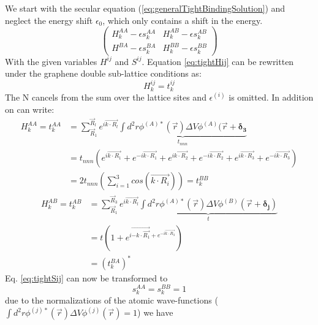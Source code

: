 		We start with the secular equation (\ref{eq:generalTightBindingSolution}) and neglect the energy shift $\epsilon_0$, which only contains a shift in the energy.
		\begin{equation}
			\begin{pmatrix}
				H_k^{AA} - \epsilon s_k^{AA} & 	H_k^{AB} - \epsilon s_k^{AB} \\
				H^{BA} - \epsilon s_k^{BA} & 	H_k^{BB} - \epsilon s_k^{BB}
			\end{pmatrix}
		\end{equation}
		With the given variables $H^{ij}$ and $S^{ij}$. Equation \ref{eq:tightHij} can be rewritten under the graphene double sub-lattice conditions as:
		\begin{equation}
			H_k^{ij} = t_k^{ij}
		\end{equation}
		The N cancels from the sum over the lattice sites and $\epsilon^{(i)}$ is omitted. In addition on can write: 
		\begin{equation}
			\begin{split}
				H_k^{AA} = t_k^{AA} &= \sum_{\vec R_1}^{\vec R_l} e^{i \vec{k \cdot R_l}} \underbrace{\int d^2 r \phi^{(A)*}(\vec{r}) \Delta V \phi^{(A)}(\vec{r} + \boldsymbol{\delta_3}}_{t_{nnn}} \\ 
				 &= t_{nnn} (e^{i \vec{k \cdot R_1}} + e^{-i \vec{k \cdot R_1}} + e^{i \vec{k \cdot R_2}} + e^{-i \vec{k \cdot R_2}} + e^{i \vec{k \cdot R_3}} + e^{-i \vec{k \cdot R_3}}) \\
				 &= 2t_{nnn} ( \sum_{i=1}^{3} cos(\vec{k \cdot R_i}))	= t_k^{BB}
			\end{split}			
		\end{equation}
		\begin{equation}
			\begin{split}		
				H_k^{AB} = t_k^{AB} &= \sum_{\vec R_1}^{\vec R_3} e^{i \vec{k \cdot R_l}} \underbrace{\int d^2 r \phi^{(A)*}(\vec{r}) \Delta V \phi^{(B)}(\vec{r} + \boldsymbol{\delta_j})}_{t} \\
				&= t(1 + e^{i \vec{-k \cdot \vec{R_1}} + e^{-i \vec{k \cdot R_3}}}) 	\\
				&= (t_k^{BA})^*	
			\end{split}			
		\end{equation}
		Eq. \ref{eq:tightSij} can now be transformed to
		\begin{equation}
				s_k^{AA} = s_k^{BB} = 1	
		\end{equation}
		due to the normalizations of the atomic wave-functions ($\int d^2 r \phi^{(j)*}(\vec r) \Delta V \phi^{(j)}(\vec r) = 1$) we have
